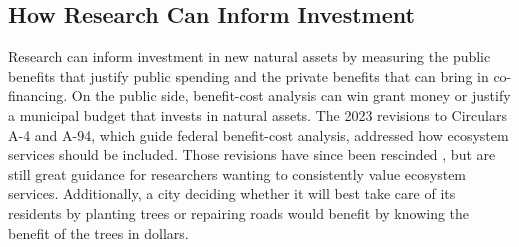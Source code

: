 \documentclass[12pt]{article}
\begin{document}
\subsection{How Research Can Inform Investment}\label{sec:research}
%

Research can inform investment in new natural assets by measuring the public benefits that justify public spending and the private benefits that can bring in co-financing. On the public side, benefit-cost analysis can win grant money or justify a municipal budget that invests in natural assets. The 2023 revisions to Circulars A-4 and A-94, which guide federal benefit-cost analysis, addressed how ecosystem services should be included. Those revisions have since been rescinded \citep{gilligham_reep, sarinskyLegalDynamicsRescinding2025}, but are still great guidance for researchers wanting to consistently value ecosystem services. Additionally, a city deciding whether it will best take care of its residents by planting trees or repairing roads would benefit by knowing the benefit of the trees in dollars. 
\end{document}
